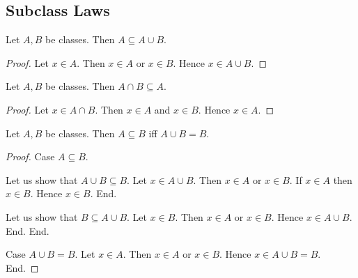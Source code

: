 \documentclass[10pt]{article}
\begin{document}
  \subsection*{Subclass Laws}

  \begin{forthel}
    \begin{proposition}[id=FOUNDATIONS_02_3793981508943872,printid]
      Let $A, B$ be classes.
      Then $A \subseteq A \cup B$.
    \end{proposition}
    \begin{proof}
      Let $x \in A$.
      Then $x \in A$ or $x \in B$.
      Hence $x \in A \cup B$.
    \end{proof}
  \end{forthel}

  \begin{forthel}
    \begin{proposition}[id=FOUNDATIONS_02_1591517646946304,printid]
      Let $A, B$ be classes.
      Then $A \cap B \subseteq A$.
    \end{proposition}
    \begin{proof}
      Let $x \in A \cap B$.
      Then $x \in A$ and $x \in B$.
      Hence $x \in A$.
    \end{proof}
  \end{forthel}

  \begin{forthel}
    \begin{proposition}[id=FOUNDATIONS_02_6657236858306560,printid]
      Let $A, B$ be classes.
      Then $A \subseteq B$ iff $A \cup B = B$.
    \end{proposition}
    \begin{proof}
      Case $A \subseteq B$.

        Let us show that $A \cup B \subseteq B$.
          Let $x \in A \cup B$.
          Then $x \in A$ or $x \in B$.
          If $x \in A$ then $x \in B$.
          Hence $x \in B$.
        End.

        Let us show that $B \subseteq A \cup B$.
          Let $x \in B$.
          Then $x \in A$ or $x \in B$.
          Hence $x \in A \cup B$.
        End.
      End.

      Case $A \cup B = B$.
        Let $x \in A$.
        Then $x \in A$ or $x \in B$.
        Hence $x \in A \cup B = B$.
      End.
    \end{proof}
  \end{forthel}
\end{document}
